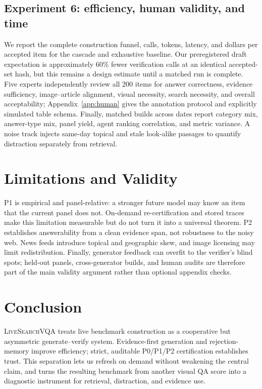 \documentclass{article}
\newcommand{\bench}{\textsc{LiveSearchVQA}}
\newcommand{\placeholder}[1]{\textcolor{blue!65!black}{#1}}
\begin{document}
\subsection{Experiment 6: efficiency, human validity, and time}
We report the complete construction funnel, calls, tokens, latency, and dollars
per accepted item for the cascade and exhaustive baseline.
Our preregistered draft expectation is approximately \placeholder{60\%} fewer
verification calls at an identical accepted-set hash, but this remains a
design estimate until a matched run is complete.
Five experts independently review all 200 items for answer correctness,
evidence sufficiency, image--article alignment, visual necessity, search
necessity, and overall acceptability; Appendix~\ref{app:human} gives the
annotation protocol and explicitly simulated table schema.
Finally, matched builds across dates report category mix, answer-type mix,
panel yield, agent ranking correlation, and metric variance.
A noise track injects same-day topical and stale look-alike passages to quantify
distraction separately from retrieval.

\section{Limitations and Validity}
P1 is empirical and panel-relative: a stronger future model may know an item
that the current panel does not.
On-demand re-certification and stored traces make this limitation measurable but
do not turn it into a universal theorem.
P2 establishes answerability from a clean evidence span, not robustness to
the noisy web.
News feeds introduce topical and geographic skew, and image licensing may
limit redistribution.
Finally, generator feedback can overfit to the verifier's blind spots; held-out
panels, cross-generator builds, and human audits are therefore part of the
main validity argument rather than optional appendix checks.

\section{Conclusion}
\bench{} treats live benchmark construction as a cooperative but asymmetric
generate--verify system.
Evidence-first generation and rejection-memory improve efficiency; strict,
auditable P0/P1/P2 certification establishes trust.
This separation lets us refresh on demand without weakening the central
claim, and turns the resulting benchmark from another visual QA score into a
diagnostic instrument for retrieval, distraction, and evidence use.
\end{document}
